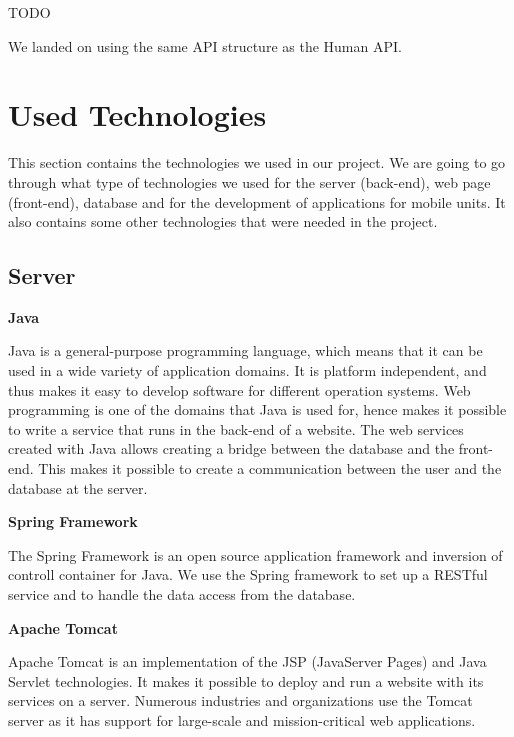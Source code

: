 TODO

We landed on using the same API structure as the Human API.


\section{Used Technologies}

This section contains the technologies we used in our project.
We are going to go through what type of technologies we used for the server (back-end), web page (front-end), database and for the development of applications for mobile units. 
It also contains some other technologies that were needed in the project.

\subsection{Server}

\textbf{Java} \cite{Java}

Java is a general-purpose programming language, which means that it can be used in a wide variety of application domains.
It is platform independent, and thus makes it easy to develop software for different operation systems.
Web programming is one of the domains that Java is used for, hence makes it possible to write a service that runs in the back-end of a website.
The web services created with Java allows creating a bridge between the database and the front-end. 
This makes it possible to create a communication between the user and the database at the server.

\textbf{Spring Framework} \cite{SpringFramework1}\cite{SpringFramework2}

The Spring Framework is an open source application framework and inversion of controll container for Java. 
We use the Spring framework to set up a RESTful service and to handle the data access from the database. 

\textbf{Apache Tomcat} \cite{ApacheTomcat}

Apache Tomcat is an implementation of the JSP (JavaServer Pages) and Java Servlet technologies.
It makes it possible to deploy and run a website with its services on a server.
Numerous industries and organizations use the Tomcat server as it has support for large-scale and mission-critical web applications.

